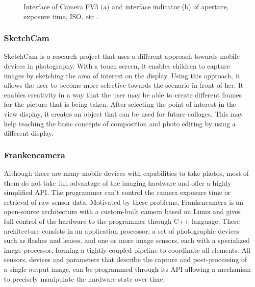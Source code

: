 \begin{figure}[htbp]
        \centering
  \caption{Interface of Camera FV5 (a) and interface indicator (b) of aperture, exposure time, ISO, etc \cite{FV5}.}
  \label{fig:FV5_image}
\end{figure}


\subsubsection{SketchCam}

SketchCam \cite{labrune2007sketchcam} is a research project that uses a different approach towards mobile devices in photography. With a touch screen, it enables children to capture images by sketching the area of interest on the display. 
Using this approach, it allows the user to become more selective towards the scenario in front of her. It enables creativity in a way that the user may be able to create different frames for the picture that is being taken.  After selecting the point of interest in the view display, it creates an object that can be used for future collages. This may help teaching the basic concepts of composition and photo editing by using a different display. 


\subsubsection{Frankencamera}

Although there are many mobile devices with capabilities to take photos, most of them do not take full advantage of the imaging hardware and offer a highly simplified API. The programmer can't control the camera exposure time or retrieval of raw sensor data. Motivated by these problems, Frankencamera \cite{adams2010frankencamera} is an open-source architecture with a custom-built camera based on Linux and gives full control of the hardware to the programmer through C++ language. These architecture consists in an application processor, a set of photographic devices such as flashes and lenses, and one or more image sensors, each with a specialized image processor, forming a tightly coupled pipeline to coordinate all elements. All sensors, devices and parameters that describe the capture and post-processing of a single output image, can be programmed through its API allowing a mechanism to precisely manipulate the hardware state over time.

